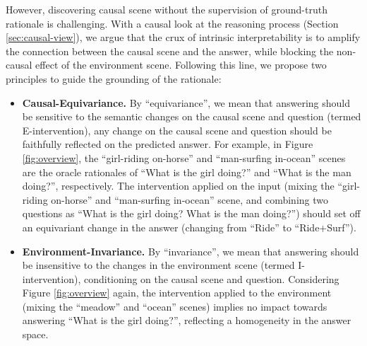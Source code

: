 %
However, discovering causal scene without the supervision of ground-truth rationale is challenging.
With a causal look at the reasoning process (\cf Section \ref{sec:causal-view}), we argue that the crux of intrinsic interpretability is to amplify the connection between the causal scene and the answer, while blocking the non-causal effect of the environment scene.
Following this line, we propose two principles to guide the grounding of the rationale:
\begin{itemize}[leftmargin=*]
    \item \textbf{Causal-Equivariance.}
    By ``equivariance'', we mean that answering should be sensitive to the semantic changes on the causal scene and question (termed E-intervention), \eg any change on the causal scene and question should be faithfully reflected on the predicted answer. For example, in Figure \ref{fig:overview}, the ``girl-riding on-horse'' and ``man-surfing in-ocean'' scenes are the oracle rationales of ``What is the girl doing?'' and ``What is the man doing?'', respectively. The intervention \cite{li2021interventional} applied on the input (\ie mixing the ``girl-riding on-horse'' and ``man-surfing in-ocean'' scene, and combining two questions as ``What is the girl doing? What is the man doing?'') should set off an equivariant change in the answer (\ie changing from ``Ride'' to ``Ride+Surf'').
    
    
    
    \item \textbf{Environment-Invariance.}
    By ``invariance'', we mean that answering should be insensitive to the changes in the environment scene (termed I-intervention), conditioning on the causal scene and question.
    Considering Figure \ref{fig:overview} again, the intervention applied to the environment (\ie mixing the ``meadow'' and ``ocean'' scenes) implies no impact towards answering ``What is the girl doing?'', reflecting a homogeneity in the answer space.
\end{itemize}


